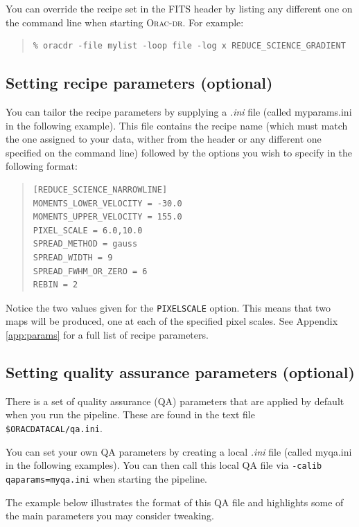 \documentclass[twoside,11pt]{article}
\newcommand{\htmladdnormallink}[2]{#1}
\renewcommand{\_}{\texttt{\symbol{95}}}
\newenvironment{myquote}{
   \color{MidnightBlue}\begin{quote}\begin{small}}{
   \end{small}\end{quote}
}
\newcommand{\oracdr}{\htmladdnormallink{\textsc{Orac-dr}}{http://www.oracdr.org/oracdr}}
\newcommand{\param}[1]{\texttt{#1}}
\renewenvironment{myquote}{
      \begin{quote}\begin{small}}{
      \end{small}\end{quote}
   }
\begin{document}
You can override the recipe set in the FITS header by listing any different
one on the command line when starting \oracdr. For example:
\begin{myquote}
\begin{verbatim}
% oracdr -file mylist -loop file -log x REDUCE_SCIENCE_GRADIENT
\end{verbatim}
\end{myquote}

\subsection{Setting recipe parameters (optional)}
\label{sec:recpars}
You can tailor the recipe parameters by supplying a  \textit{.ini} file (called myparams.ini in the following example). This file contains the recipe name (which must match the one assigned to your data, wither from the header or any different one specified on the command line) followed by the options you wish to specify in the following format:

\vspace{0.2cm}
\begin{quote}
\begin{verbatim}
[REDUCE_SCIENCE_NARROWLINE]
MOMENTS_LOWER_VELOCITY = -30.0
MOMENTS_UPPER_VELOCITY = 155.0
PIXEL_SCALE = 6.0,10.0
SPREAD_METHOD = gauss
SPREAD_WIDTH = 9
SPREAD_FWHM_OR_ZERO = 6
REBIN = 2
\end{verbatim}
\end{quote}

Notice the two values given for the  \param{PIXEL\_SCALE} option. This means that two maps will be produced, one at each of the specified pixel scales. See Appendix \ref{app:params} for a full list of recipe parameters.


\subsection{Setting quality assurance parameters (optional)}
\label{sec:qa}
There is a set of quality assurance (QA) parameters that are applied by default when you run the pipeline. These are found in the text file \param{\$ORAC\_DATA\_CAL/qa.ini}.

You can set your own QA parameters by creating a local \textit{.ini} file (called myqa.ini in the following examples). You can then call this local QA file via \param{-calib qaparams=myqa.ini} when starting the pipeline. 

The example below illustrates the format of this QA file and highlights some of the main parameters you may consider tweaking.
\end{document}
